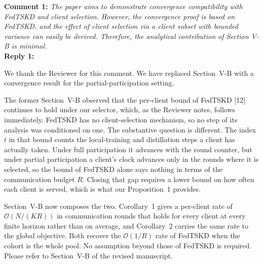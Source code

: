 \documentclass[10pt]{article}
\begin{document}
\noindent
\textbf{Comment 1:} \textit{The paper aims to demonstrate convergence compatibility with FedTSKD and client selection. However, the convergence proof is based on FedTSKD, and the effect of client selection via a client subset with bounded variance can easily be derived. Therefore, the analytical contribution of Section V-B is minimal.} \\
\noindent
\textbf{Reply 1:} {We thank the Reviewer for this comment. We have replaced Section~V-B with a convergence result for the partial-participation setting.

The former Section~V-B observed that the per-client bound of FedTSKD [12] continues to hold under our selector, which, as the Reviewer notes, follows immediately. FedTSKD has no client-selection mechanism, so no step of its analysis was conditioned on one. The substantive question is different. The index $t$ in that bound counts the local-training and distillation steps a client has actually taken. Under full participation it advances with the round counter, but under partial participation a client's clock advances only in the rounds where it is selected, so the bound of FedTSKD alone says nothing in terms of the communication budget $R$. Closing that gap requires a lower bound on how often each client is served, which is what our Proposition~1 provides.

Section~V-B now composes the two. Corollary~1 gives a per-client rate of $\mathcal{O}(N/(KR))$ in communication rounds that holds for every client at every finite horizon rather than on average, and Corollary~2 carries the same rate to the global objective. Both recover the $\mathcal{O}(1/R)$ rate of FedTSKD when the cohort is the whole pool. No assumption beyond those of FedTSKD is required. Please refer to Section~V-B of the revised manuscript.}\\
\end{document}
